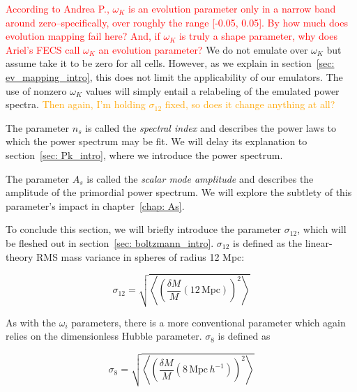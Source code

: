 
\textcolor{red}{According to Andrea P., $\omega_K$ is an evolution parameter 
only in a narrow 
band around zero--specifically, over roughly the range [-0.05, 0.05].
By how much does evolution mapping fail here? And, if 
$\omega_K$ is truly a shape parameter, why does Ariel's FECS call $\omega_K$
an evolution parameter?} We do not emulate over $\omega_K$ but assume take
it to be zero for all cells. However, as we explain in
section~\ref{sec: ev_mapping_intro}, this does not limit the applicability of
our emulators. The use of nonzero $\omega_K$ values will simply entail a
relabeling of the emulated power spectra. \textcolor{orange}{Then again, I'm
holding $\sigma_{12}$ fixed, so does it change anything at all?}


The parameter $n_s$ is called the \textit{spectral index} and describes the 
power laws
to which the power spectrum may be fit. We will delay its explanation to
section~\ref{sec: Pk_intro}, where we introduce the power spectrum.


The parameter $A_s$ is called the \textit{scalar mode amplitude} and describes
the amplitude of the primordial power spectrum. We will explore the subtlety of this parameter's impact in
chapter~\ref{chap: As}.


To conclude this section, we will briefly introduce the parameter
$\sigma_{12}$, which will be fleshed out in
section~\ref{sec: boltzmann_intro}. 
$\sigma_{12}$ is defined as the linear-theory RMS mass variance in spheres
of radius 12 Mpc:

\begin{equation}
\label{eq: sigma12}
\sigma_{12}
=
\sqrt{\left\langle \left(
	\frac{\delta M}{M} (12 \, \mathrm{Mpc})
\right)^2 \right\rangle}
\end{equation}

As with the $\omega_i$ parameters, there is a more conventional parameter
which again relies on the dimensionless Hubble parameter. $\sigma_8$ is
defined as

\begin{equation}
\sigma_8
=
\sqrt{\left\langle \left(
	\frac{\delta M}{M} (8 \, \mathrm{Mpc} \, h^{-1})
\right)^2 \right\rangle}
\end{equation}

